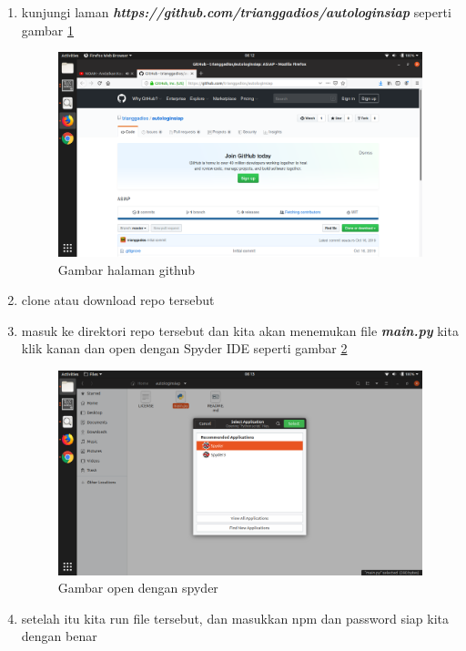 \begin{enumerate}
\item kunjungi laman \textbf{\textit{https://github.com/trianggadios/autologinsiap}} seperti gambar \ref{webgithub}
\begin{figure}[H]
\centering
\includegraphics[width=1\textwidth]{figures/webgithub.png}
\caption{Gambar halaman github}
\label{webgithub}
\end{figure}

\item clone atau download repo tersebut
\item masuk ke direktori repo tersebut dan kita akan menemukan file \textbf{\textit{main.py}} kita klik kanan dan open dengan Spyder IDE seperti gambar \ref{openwithspyder}
\begin{figure}[H]
\centering
\includegraphics[width=1\textwidth]{figures/openwithspyder.png}
\caption{Gambar open dengan spyder}
\label{openwithspyder}
\end{figure}

\item setelah itu kita run file tersebut, dan masukkan npm dan password siap kita dengan benar

\end{enumerate}

